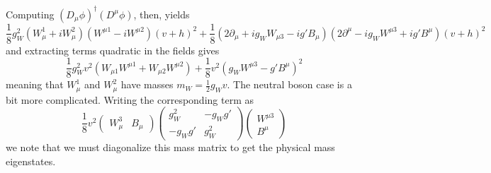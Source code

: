 Computing $(D_{\mu}\phi)^{\dagger}(D^{\mu}\phi)$, then, yields
\begin{equation}
\frac{1}{8}g_{W}^2(W_{\mu}^1+iW_{\mu}^2)(W^{\mu 1}-iW^{\mu 2})(v+h)^2 + 
\frac{1}{8}(2\partial_{\mu}+ig_{W}W_{\mu 3}-ig'B_{\mu})(2\partial^{\mu}-ig_{W}W^{\mu 3}+ig'B^{\mu})(v+h)^2
\end{equation}
and extracting terms quadratic in the fields gives
\begin{equation}
\frac{1}{8}g_{W}^2v^2(W_{\mu 1}W^{\mu 1}+W_{\mu 2}W^{\mu 2}) + \frac{1}{8}v^2(g_{W}W^{\mu 3}-g'B^{\mu})^2
\end{equation}
meaning that $W_{\mu}^1$ and $W_{\mu}^2$ have masses $m_{W} = \frac{1}{2}g_{W}v$. The neutral boson case 
is a bit more complicated. Writing the corresponding term as
\begin{equation}
\frac{1}{8}v^2\begin{pmatrix}W_{\mu}^3&B_{\mu}\end{pmatrix} 
\begin{pmatrix}g_{W}^2 & -g_{W}g'\\-g_{W}g' & g_{W}^2\end{pmatrix} 
\begin{pmatrix}W^{\mu 3}\\B^{\mu}\end{pmatrix}
\end{equation}
we note that we must diagonalize this mass matrix to get the physical mass eigenstates.










